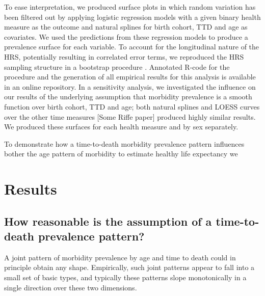 \documentclass[11pt,oneside,a4paper]{article} %
\begin{document}
To ease interpretation, we produced surface plots in which random variation has been filtered out by applying logistic regression models with a given binary health measure as the outcome and natural splines for birth cohort, TTD and age as covariates. We used the predictions from these regression models to produce a prevalence surface for each variable. To account for the longitudinal nature of the HRS, potentially resulting in correlated error terms, we reproduced the HRS sampling structure in a bootstrap procedure \citep{efron1994introduction}. Annotated R-code for the procedure and the generation of all empirical results for this analysis is available in an online repository. In a sensitivity analysis, we investigated the influence on our results of the underlying assumption that morbidity prevalence is a smooth function over birth cohort, TTD and age; both natural splines and LOESS curves over the other time measures [Some Riffe paper] produced highly similar results. We produced these surfaces for each health measure and by sex separately.
% 


To demonstrate how a time-to-death morbidity prevalence pattern influences bother the age pattern of morbidity to estimate healthy life expectancy we 





\section{Results}
\subsection{How reasonable is the assumption of a time-to-death prevalence pattern?}
\label{sec:ttdok}
A joint pattern of morbidity prevalence by age and time to death could in principle obtain any shape. Empirically, such joint patterns appear to fall into a small set of basic types, and typically these patterns slope monotonically in a single direction over these two dimensions.
\end{document}
